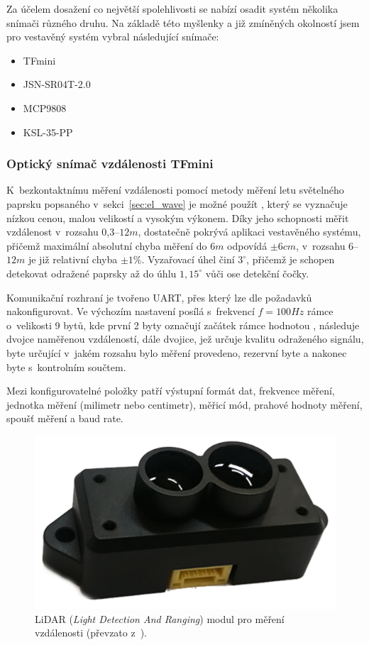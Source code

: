             Za účelem dosažení co největší spolehlivosti se nabízí osadit systém několika snímači různého druhu. Na základě této myšlenky a již zmíněných okolností jsem pro vestavěný systém vybral následující snímače: 
            \begin{itemize}
                \item TFmini
                \item JSN-SR04T-2.0
                \item MCP9808 
                \item KSL-35-PP
            \end{itemize}

            \subsubsection{Optický snímač vzdálenosti TFmini}

                K~bezkontaktnímu měření vzdálenosti pomocí metody měření letu světelného paprsku popsaného v~sekci~\ref{sec:el_wave} je možné použít , který se vyznačuje nízkou cenou, malou velikostí a vysokým výkonem. Díky jeho schopnosti měřit vzdálenost v~rozsahu 0,3--$12\unit{m}$, dostatečně pokrývá aplikaci vestavěného systému, přičemž maximální absolutní chyba měření do $6\unit{m}$ odpovídá $\pm 6\unit{cm}$, v~rozsahu 6--$12\unit{m}$ je již relativní chyba $\pm 1\unit{\%}$. Vyzařovací úhel činí $3^\circ$, přičemž je schopen detekovat odražené paprsky až do úhlu $1,15^\circ$ vůči ose detekční čočky.~\cite{sensor:lidar}

                Komunikační rozhraní je tvořeno UART, přes který lze  dle požadavků nakonfigurovat. Ve výchozím nastavení posílá s~frekvencí $f = 100\unit{Hz}$ rámce o~velikosti 9 bytů, kde první 2 byty označují začátek rámce hodnotou , následuje dvojce naměřenou vzdáleností, dále dvojice, jež určuje kvalitu odraženého signálu, byte určující v~jakém rozsahu bylo měření provedeno, rezervní byte a nakonec byte s~kontrolním součtem.

                Mezi konfigurovatelné položky patří výstupní formát dat, frekvence měření, jednotka měření (milimetr nebo centimetr), měřicí mód, prahové hodnoty měření, spoušť měření a baud rate.

                \begin{figure}[h]
                    \centering
                    \includegraphics[width=0.4\linewidth]{obrazky-figures/lidar.pdf}
                    \caption{LiDAR (\textit{Light Detection And Ranging}) modul pro měření vzdálenosti (převzato z~\cite{shop:lidar}).}
                    \label{img:lidar}
                \end{figure}

